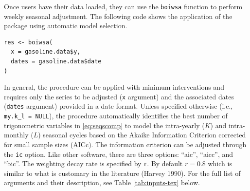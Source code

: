 Once users have their data loaded, they can use the \texttt{boiwsa} function to perform weekly seasonal adjustment. The following code shows the application of the package using automatic model selection.

\begin{verbatim}
res <- boiwsa(
  x = gasoline.data$y,
  dates = gasoline.data$date
)
\end{verbatim}

In general, the procedure can be applied with minimum interventions and requires only the series to be adjusted (\texttt{x} argument) and the associated dates (\texttt{dates} argument) provided in a date format. Unless specified otherwise (i.e., \texttt{my.k\_l\ =\ NULL}), the procedure automatically identifies the best number of trigonometric variables in \eqref{eq:seqscomp} to model the intra-yearly (\(K\)) and intra-monthly (\(L\)) seasonal cycles based on the Akaike Information Criterion corrected for small sample sizes (AICc). The information criterion can be adjusted through the \texttt{ic} option. Like other software, there are three options: ``aic'', ``aicc'', and ``bic''. The weighting decay rate is specified by \texttt{r}. By default \(r=0.8\) which is similar to what is customary in the literature (Harvey 1990). For the full list of arguments and their description, see Table \ref{tab:inputs-tex} below.

\begin{table}[H]
\centering
\caption{\label{tab:inputs-tex}Input arguments for boiwsa}
\centering
{}
\end{table}

